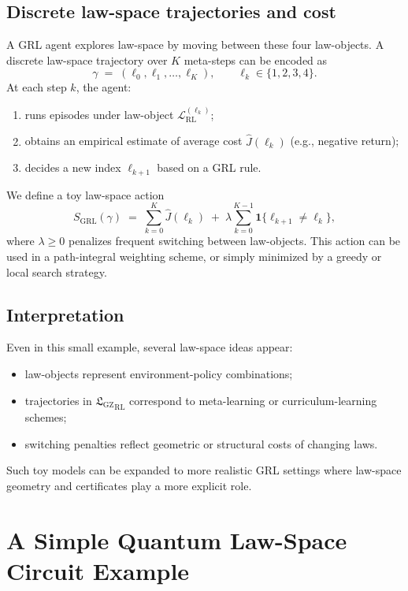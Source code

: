 \documentclass[11pt]{book}
\newcommand{\GZLS}{\ensuremath{\mathfrak{L}_{\mathrm{GZ}}}}
\theoremstyle{plain}
\theoremstyle{definition}
\theoremstyle{remark}
\begin{document}
\subsection*{Discrete law-space trajectories and cost}

A GRL agent explores law-space by moving between these four
law-objects. A discrete law-space trajectory over $K$ meta-steps
can be encoded as
\[
   \gamma
   \;=\;
   (\ell_0,\ell_1,\dots,\ell_K),
   \qquad
   \ell_k \in \{1,2,3,4\}.
\]
At each step $k$, the agent:
\begin{enumerate}
  \item runs episodes under law-object
        $\mathcal{L}_{\mathrm{RL}}^{(\ell_k)}$;
  \item obtains an empirical estimate of average cost
        $\widehat{J}(\ell_k)$ (e.g., negative return);
  \item decides a new index $\ell_{k+1}$ based on a GRL rule.
\end{enumerate}

We define a toy law-space action
\[
   S_{\mathrm{GRL}}(\gamma)
   \;=\;
   \sum_{k=0}^K \widehat{J}(\ell_k)
   \;+\;
   \lambda \sum_{k=0}^{K-1}
   \mathbf{1}\{\ell_{k+1} \neq \ell_k\},
\]
where $\lambda \ge 0$ penalizes frequent switching between
law-objects. This action can be used in a path-integral weighting
scheme, or simply minimized by a greedy or local search strategy.

\subsection*{Interpretation}

Even in this small example, several law-space ideas appear:
\begin{itemize}
  \item law-objects represent environment-policy combinations;
  \item trajectories in ${\GZLS}_{\mathrm{RL}}$ correspond to
        meta-learning or curriculum-learning schemes;
  \item switching penalties reflect geometric or structural costs of
        changing laws.
\end{itemize}
Such toy models can be expanded to more realistic GRL settings
where law-space geometry and certificates play a more explicit role.

\section{A Simple Quantum Law-Space Circuit Example}
\label{sec:example-quantum-lawspace}
\end{document}
